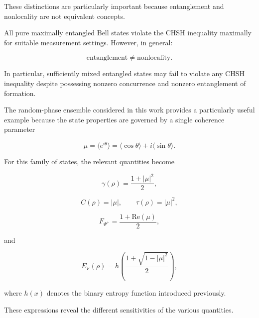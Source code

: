 \medskip

These distinctions are particularly important because entanglement and nonlocality are not equivalent concepts.

\medskip

All pure maximally entangled Bell states violate the CHSH inequality maximally for suitable measurement settings. However, in general:

\[
\text{entanglement}
\neq
\text{nonlocality}.
\]

In particular, sufficiently mixed entangled states may fail to violate any CHSH inequality despite possessing nonzero concurrence and nonzero entanglement of formation.

\medskip

The random-phase ensemble considered in this work provides a particularly useful example because the state properties are governed by a single coherence parameter

\begin{equation}
\mu
=
\langle e^{i\theta}\rangle
=
\langle \cos\theta\rangle
+
i\langle \sin\theta\rangle.
\label{eq:coherence_parameter_trigonometric_updated}
\end{equation}

For this family of states, the relevant quantities become

\begin{equation}
\gamma(\rho)
=
\frac{1+|\mu|^2}{2},
\label{eq:purity_mu_relation}
\end{equation}

\begin{equation}
C(\rho)
=
|\mu|,
\qquad
\tau(\rho)
=
|\mu|^2,
\label{eq:concurrence_tangle_mu_relation}
\end{equation}

\begin{equation}
F_{\Psi^+}
=
\frac{1+\mathrm{Re}(\mu)}{2},
\label{eq:fidelity_mu_relation}
\end{equation}

and

\begin{equation}
E_F(\rho)
=
h
\left(
\frac{
1+\sqrt{1-|\mu|^2}
}{2}
\right),
\label{eq:eof_mu_relation}
\end{equation}

where \( h(x) \) denotes the binary entropy function introduced previously.

\medskip

These expressions reveal the different sensitivities of the various quantities.

